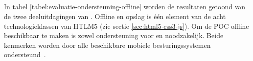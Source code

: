 % 
% 
% 
% 


\subsection{}
\label{sec:evaluatie-ondersteuning-offline}

In tabel \ref{tabel:evaluatie-ondersteuning-offline} worden de resultaten getoond van de twee deeluitdagingen van .
Offline en opslag is één element van de acht technologieklassen van HTLM5 (zie sectie \ref{sec:html5-css3-js}).
Om de POC offline beschikbaar te maken is zowel ondersteuning voor  en  noodzakelijk.
Beide kenmerken worden door alle beschikbare mobiele besturingssystemen ondersteund~\cite{Deveria2013c}. 



